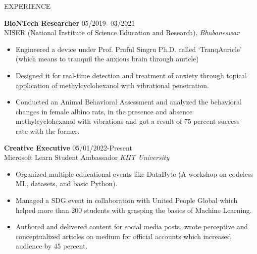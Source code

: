 \documentclass{resume}
\begin{document}
\begin{rSection}{EXPERIENCE}

\textbf{BioNTech Researcher} \hfill 05/2019- 03/2021\\
NISER (National Institute of Science Education and Research),   \hfill \textit{Bhubaneswar}

\vspace{-0.5em}

 \begin{itemize}
    \itemsep -2pt {} 
     \item Engineered a device under Prof. Praful Singru Ph.D. called ‘TranqAuricle’ (which means to tranquil the anxious brain through auricle) 
     
     \vspace{-0.5em}
     
     \item Designed it for real-time detection and treatment of anxiety through topical application of methylcyclohexanol with vibrational penetration.
     \vspace{-0.5em}
     
     \item Conducted an Animal Behavioral Assessment and analyzed the behavioral changes in female albino rats, in the presence and absence methylcyclohexanol with vibrations and got a result of 75 percent success rate with the former. 
     
     \vspace{-0.4em}
     
 \end{itemize}
 
\textbf{Creative Executive} \hfill 05/01/2022-Present\\
Microsoft Learn Student Ambassador  \hfill \textit{KIIT University}

\vspace{-0.5em}

 \begin{itemize}
    \itemsep -2pt {} 
     \item Organized multiple educational events like DataByte (A workshop on codeless ML, datasets, and basic Python).
     
     \vspace{-0.5em}
     
     \item Managed a SDG event in collaboration with United People Global which helped more than 200 students with grasping the basics of Machine Learning.
     
     \vspace{-0.5em}
     
     \item Authored and delivered content for social media posts, wrote perceptive and conceptualized articles on medium for official accounts which increased audience by 45 percent.
     
     \vspace{-0.1em}
     
 \end{itemize}

\end{rSection} 
\end{document}

